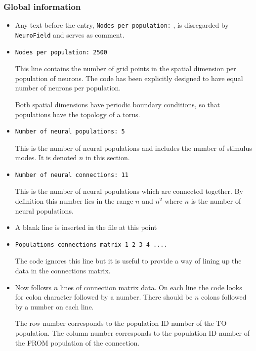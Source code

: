 \documentclass[12pt,a4paper]{article}
\newcommand{\type}[1]{ {\small\small\tt #1} }
\begin{document}
\subsubsection{Global information}
\label{sec:global}
\begin{itemize}

\item Any text before the entry, \type{Nodes per population:}, is disregarded by \type{NeuroField} and serves as comment.
\item
\begin{lstlisting}
Nodes per population: 2500
\end{lstlisting}
This line contains the number of grid points in the spatial dimension per population of neurons. The code has been explicitly designed to have equal number of neurons per population.

Both spatial dimensions have periodic boundary conditions, so that populations have the topology of a torus.
\item
\begin{lstlisting}
Number of neural populations: 5
\end{lstlisting} This is the number of neural
populations and includes the number of stimulus modes. It is denoted
$n$ in this section.
\item
\begin{lstlisting}
Number of neural connections: 11
\end{lstlisting} This is the number of neural
populations which are connected together. By definition this number lies in the
range $n$ and $n^2$ where $n$ is the number of neural populations.
\item A blank line is inserted in the file at this point
\item
\begin{lstlisting}
Populations connections matrix 1 2 3 4 ....
\end{lstlisting} The code ignores this
line but it is useful to provide a way of lining up the data in the
connections matrix.
\item Now follows $n$ lines of connection matrix data. On each line the code looks for colon character followed by a number. There should be $n$ colons followed by a number on each line.
	
The row number corresponds to the population ID number of the TO population. The column number corresponds to the population ID number of the FROM population of the connection.


\end{itemize}
\end{document}
